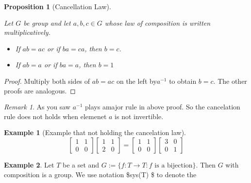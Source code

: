 \documentclass[
]{book}
\providecommand{\tightlist}{%
  \setlength{\itemsep}{0pt}\setlength{\parskip}{0pt}}
\newtheorem{proposition}{Proposition}[chapter]
\theoremstyle{definition}
\theoremstyle{definition}
\newtheorem{example}{Example}[chapter]
\theoremstyle{definition}
\theoremstyle{definition}
\theoremstyle{remark}
\newtheorem*{remark}{Remark}
\begin{document}
\begin{proposition}[Cancellation Law]
\protect\hypertarget{prp:unnamed-chunk-7}{}\label{prp:unnamed-chunk-7}

Let \(G\) be group and let \(a, b, c \in G\) whose law of composition is written multiplicatively.

\begin{itemize}
\tightlist
\item
  If \(ab = ac\) or if \(ba = ca\), then \(b = c\).
\item
  If \(a b = a\) or if \(ba = a\), then \(b = 1\)
\end{itemize}

\end{proposition}

\begin{proof}
Multiply both sides of \(ab=ac\) on the left by\(a^{-1}\) to obtain \(b = c\). The other proofs are analogous.
\end{proof}

\begin{remark}
As you saw \(a^{-1}\) plays amajor rule in above proof. So the cancelation rule does not holds when elemenet \(a\) is not invertible.
\end{remark}

\begin{example}[Example that not holding the cancelation law]
\protect\hypertarget{exm:unnamed-chunk-10}{}\label{exm:unnamed-chunk-10}\[\begin{bmatrix} 1 & 1 \\ 0 & 0\end{bmatrix}
\begin{bmatrix} 1 & 1 \\ 2 & 0\end{bmatrix}=
\begin{bmatrix} 1 & 1 \\ 0 & 0\end{bmatrix}
\begin{bmatrix} 3 & 0 \\ 0 & 1\end{bmatrix}\]
\end{example}

\begin{example}
\protect\hypertarget{exm:unnamed-chunk-11}{}\label{exm:unnamed-chunk-11}Let \(T\) be a set and \(G:=\{f:T\to T: f \text{ is a bijection}\}\). Then \(G\) with composition is a group. We use notation \$sys(T) \$ to denote the
\end{example}
\end{document}
